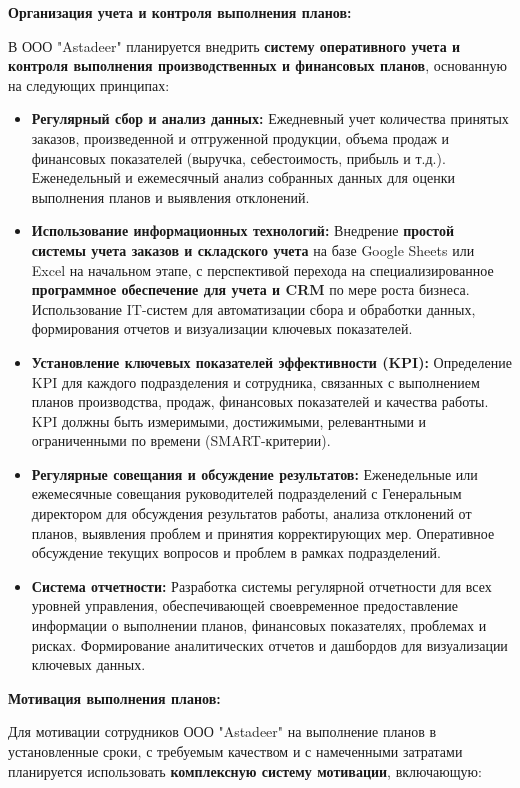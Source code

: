 \textbf{Организация учета и контроля выполнения планов:}

В ООО "Astadeer" планируется внедрить \textbf{систему оперативного учета и контроля выполнения производственных и финансовых планов}, основанную на следующих принципах:

\begin{itemize}
    \item \textbf{Регулярный сбор и анализ данных:}  Ежедневный учет количества принятых заказов, произведенной и отгруженной продукции, объема продаж и финансовых показателей (выручка, себестоимость, прибыль и т.д.).  Еженедельный и ежемесячный анализ собранных данных для оценки выполнения планов и выявления отклонений.
    \item \textbf{Использование информационных технологий:}  Внедрение \textbf{простой системы учета заказов и складского учета} на базе Google Sheets или Excel на начальном этапе, с перспективой перехода на специализированное \textbf{программное обеспечение для учета и CRM} по мере роста бизнеса.  Использование IT-систем для автоматизации сбора и обработки данных, формирования отчетов и визуализации ключевых показателей.
    \item \textbf{Установление ключевых показателей эффективности (KPI):}  Определение KPI для каждого подразделения и сотрудника, связанных с выполнением планов производства, продаж, финансовых показателей и качества работы.  KPI должны быть измеримыми, достижимыми, релевантными и ограниченными по времени (SMART-критерии).
    \item \textbf{Регулярные совещания и обсуждение результатов:}  Еженедельные или ежемесячные совещания руководителей подразделений с Генеральным директором для обсуждения результатов работы, анализа отклонений от планов, выявления проблем и принятия корректирующих мер.  Оперативное обсуждение текущих вопросов и проблем в рамках подразделений.
    \item \textbf{Система отчетности:}  Разработка системы регулярной отчетности для всех уровней управления, обеспечивающей своевременное предоставление информации о выполнении планов, финансовых показателях, проблемах и рисках.  Формирование аналитических отчетов и дашбордов для визуализации ключевых данных.
\end{itemize}

\textbf{Мотивация выполнения планов:}

Для мотивации сотрудников ООО "Astadeer" на выполнение планов в установленные сроки, с требуемым качеством и с намеченными затратами планируется использовать \textbf{комплексную систему мотивации}, включающую:

